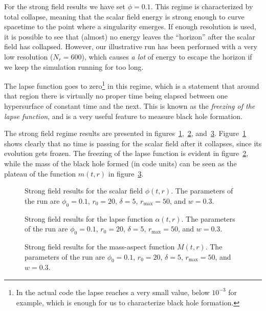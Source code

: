 \documentclass[a4paper,11pt]{article}
\renewcommand{\a}{\alpha}
\begin{document}
For the strong field results we have set $\phi=0.1$. This regime is characterized by total collapse, meaning that the scalar field energy is strong enough to curve spacetime to the point where a singularity emerges. If enough resolution is used, it is possible to see that (almost) no energy leaves the ``horizon'' after the scalar field has collapsed. However, our illustrative run has been performed with a very low resolution ($N_{r}=600$), which causes \emph{a lot} of energy to escape the horizon if we keep the simulation running for too long.

The lapse function goes to zero\footnote{In the actual code the lapse reaches a very small value, below $10^{-3}$ for example, which is enough for us to characterize black hole formation.} in this regime, which is a statement that around that region there is virtually no proper time being elapsed between one hypersurface of constant time and the next. This is known as the \emph{freezing of the lapse function}, and is a very useful feature to measure black hole formation.

The strong field regime results are presented in figures~\ref{fig:phi_strong},~\ref{fig:alpha_strong}, and~\ref{fig:mass_strong}. Figure~\ref{fig:phi_strong} shows clearly that no time is passing for the scalar field after it collapses, since its evolution gets frozen. The freezing of the lapse function is evident in figure~\ref{fig:alpha_strong}, while the mass of the black hole formed (in code units) can be seen as the plateau of the function $m(t,r)$ in figure~\ref{fig:mass_strong}.

\begin{figure}[ht]
  \centering
  
  \caption[Old strong field results for the scalar field $\phi(t,r)$.]{Strong field results for the scalar field $\phi(t,r)$. The parameters of the run are $\phi_{0}=0.1$, $r_{0}=20$, $\delta=5$, $r_{\max}=50$, and $w=0.3$.}
  \label{fig:phi_strong}
\end{figure}

\begin{figure}[ht]
  \centering
  
  \caption[Old strong field results for the lapse function $\a(t,r)$.]{Strong field results for the lapse function $\a(t,r)$. The parameters of the run are $\phi_{0}=0.1$, $r_{0}=20$, $\delta=5$, $r_{\max}=50$, and $w=0.3$.}
  \label{fig:alpha_strong}
\end{figure}

\begin{figure}[ht]
  \centering
  
  \caption[Old strong field results for the mass-aspect function $M(t,r)$.]{Strong field results for the mass-aspect function $M(t,r)$. The parameters of the run are $\phi_{0}=0.1$, $r_{0}=20$, $\delta=5$, $r_{\max}=50$, and $w=0.3$.}
  \label{fig:mass_strong}
\end{figure}
\end{document}
